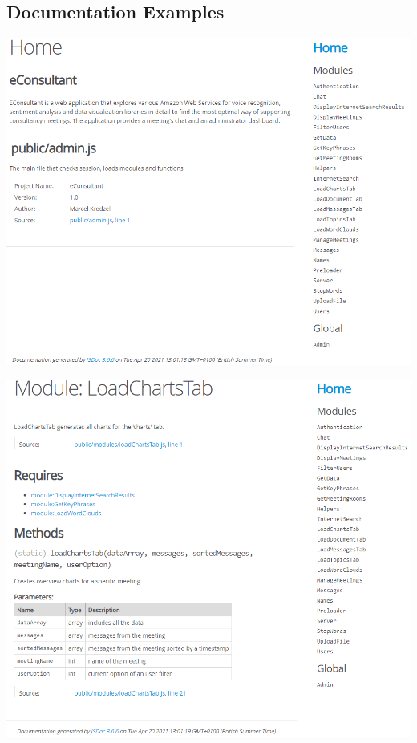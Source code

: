 \documentclass{article}
\begin{document}
\subsection{Documentation Examples}
\includegraphics[width=1\linewidth]{img/docs1.png}
\label{fig:docs1}

\newpage
\includegraphics[width=1\linewidth]{img/docs2.png}
\label{fig:docs2}
\end{document}
